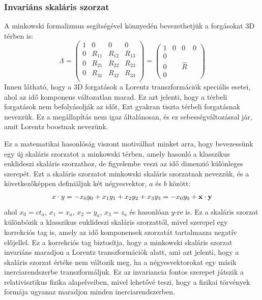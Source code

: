 \documentclass[a4paper,12pt]{article}
\begin{document}
\subsubsection*{Invariáns skaláris szorzat}
A minkowski formalizmus segítségével könnyedén bevezethetjük a forgásokat 3D térben is:
\begin{equation}
    \Lambda =
    \begin{pmatrix}
        1 & 0 & 0 & 0 \\
        0 & R_{11} & R_{12} & R_{13} \\
        0 & R_{21} & R_{22} & R_{23} \\
        0 & R_{31} & R_{32} & R_{33} \\
    \end{pmatrix}
    = 
    \begin{pmatrix}
        1 & 0 & 0 & 0 \\
        0 &  &  &  \\
        0 &  & \hat{R} &  \\
        0 &  &  & 
    \end{pmatrix}
\end{equation}
Innen látható, hogy a 3D forgatások a Lorentz transzformációk speciális esetei, ahol az idő komponens változatlan marad. Ez azt jelenti, hogy a térbeli forgatások nem befolyásolják az időt, Ezt gyakran tiszta térbeli forgatásnak nevezzük.
Ez a megállapítás nem igaz általánosan, és ez sebességváltozással jár, amit Lorentz boostnak nevezünk. 

Ez a matematikai hasonlóság viszont motiválhat minket arra, hogy bevezessünk egy új skaláris szorzatot a minkowski térben, amely hasonló a klasszikus euklideszi skaláris szorzathoz, de figyelembe veszi az idő dimenzió különleges szerepét.
Ezt a skaláris szorzatot minkowski skaláris szorzatnak nevezzük, és a következőképpen definiáljuk két négyesvektor, $a$ és $b$ között:
\begin{equation}
    x \cdot y = -x_0 y_0 + x_1 y_1 + x_2 y_2 + x_3 y_3 = -x_0 y_0 + \bold{x} \cdot \bold{y} 
\end{equation}
ahol $x_0 = ct_a$, $x_1 = x_a$, $x_2 = y_a$, $x_3 = z_a$ és hasonlóan $y$-re is. Ez a skaláris szorzat különbözik a klasszikus euklideszi skaláris szorzattól, mivel szerepel egy korrekciós tag is, amely az idő komponensek szorzatát tartalmazza negatív előjellel.
Ez a korrekciós tag biztosítja, hogy a minkowski skaláris szorzat invariáns maradjon a Lorentz transzformációk alatt, ami azt jelenti, hogy a skaláris szorzat értéke nem változik meg, ha a négyesvektorokat egy másik inerciarendszerbe transzformáljuk.
Ez az invariancia fontos szerepet játszik a relativisztikus fizika alapelveiben, mivel lehetővé teszi, hogy a fizikai törvények formája ugyanaz maradjon minden inerciarendszerben.
\end{document}
